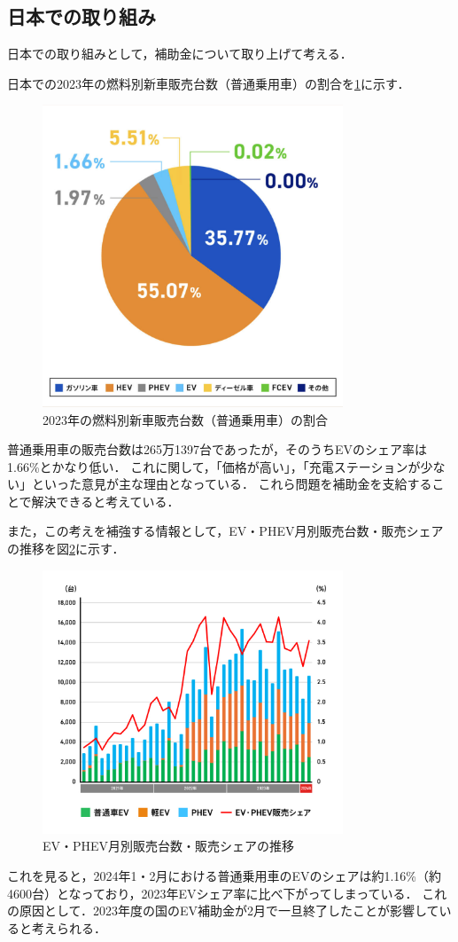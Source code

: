\documentclass[titlepage,a4paper]{jsarticle}
\begin{document}
\subsection{日本での取り組み}
日本での取り組みとして，補助金について取り上げて考える．

日本での2023年の燃料別新車販売台数（普通乗用車）の割合を\ref{EV図}に示す\cite{EV}．
\begin{figure}[H]
  \centering
  \includegraphics[width=0.8\textwidth]{img/2023EV.png}
  \caption{2023年の燃料別新車販売台数（普通乗用車）の割合}
  \label{EV図}
\end{figure}
普通乗用車の販売台数は265万1397台であったが，そのうちEVのシェア率は1.66\%とかなり低い．
これに関して，「価格が高い」，「充電ステーションが少ない」といった意見が主な理由となっている\cite{スタンド}．
これら問題を補助金を支給することで解決できると考えている．

また，この考えを補強する情報として，EV・PHEV月別販売台数・販売シェアの推移を図\ref{EVグラフ}に示す．
\begin{figure}[H]
  \centering
  \includegraphics[width=0.8\textwidth]{img/EV_graph.jpeg}
  \caption{EV・PHEV月別販売台数・販売シェアの推移}
  \label{EVグラフ}
\end{figure}
これを見ると，2024年1・2月における普通乗用車のEVのシェアは約1.16\%（約4600台）となっており，2023年EVシェア率に比べ下がってしまっている．
これの原因として．2023年度の国のEV補助金が2月で一旦終了したことが影響していると考えられる．
\end{document}
